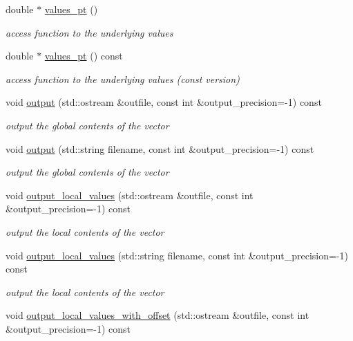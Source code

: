 \begin{DoxyCompactItemize}
double $\ast$ \hyperlink{classoomph_1_1DoubleVector_a8c3dcdf8a602a1f266bbe72d98fde2e7}{values\+\_\+pt} ()
\begin{DoxyCompactList}\small\item\em access function to the underlying values \end{DoxyCompactList}\item 
double $\ast$ \hyperlink{classoomph_1_1DoubleVector_ab88fb798be9cc01d3f3fb64db2c8c9f6}{values\+\_\+pt} () const
\begin{DoxyCompactList}\small\item\em access function to the underlying values (const version) \end{DoxyCompactList}\item 
void \hyperlink{classoomph_1_1DoubleVector_aa258eab026007d7f02847b6e5ef3d1dc}{output} (std\+::ostream \&outfile, const int \&output\+\_\+precision=-\/1) const
\begin{DoxyCompactList}\small\item\em output the global contents of the vector \end{DoxyCompactList}\item 
void \hyperlink{classoomph_1_1DoubleVector_ab236e5a906d16e8c7edc6b9acafa23e4}{output} (std\+::string filename, const int \&output\+\_\+precision=-\/1) const
\begin{DoxyCompactList}\small\item\em output the global contents of the vector \end{DoxyCompactList}\item 
void \hyperlink{classoomph_1_1DoubleVector_a2cdcd660a9a90868ba1f837095403649}{output\+\_\+local\+\_\+values} (std\+::ostream \&outfile, const int \&output\+\_\+precision=-\/1) const
\begin{DoxyCompactList}\small\item\em output the local contents of the vector \end{DoxyCompactList}\item 
void \hyperlink{classoomph_1_1DoubleVector_a1cbc454999c271e7cb476f7c5c76ce72}{output\+\_\+local\+\_\+values} (std\+::string filename, const int \&output\+\_\+precision=-\/1) const
\begin{DoxyCompactList}\small\item\em output the local contents of the vector \end{DoxyCompactList}\item 
void \hyperlink{classoomph_1_1DoubleVector_afc5d6ab2c9ba7a0f307cc419a331df70}{output\+\_\+local\+\_\+values\+\_\+with\+\_\+offset} (std\+::ostream \&outfile, const int \&output\+\_\+precision=-\/1) const

\end{DoxyCompactItemize}
